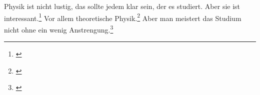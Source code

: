 \documentclass{scrartcl}
\begin{document}
	
Physik ist nicht lustig, das sollte jedem klar sein, der es studiert. Aber sie ist interessant.\footnote{\cite[S. 2]{Demtr}} Vor allem theoretische Physik.\footnote{\cite[S. 5]{Nolt}}
Aber man meistert das Studium nicht ohne ein wenig Anstrengung.\footnote{\cite[S. 3]{Bart}}
\printbibliography
\end{document}
